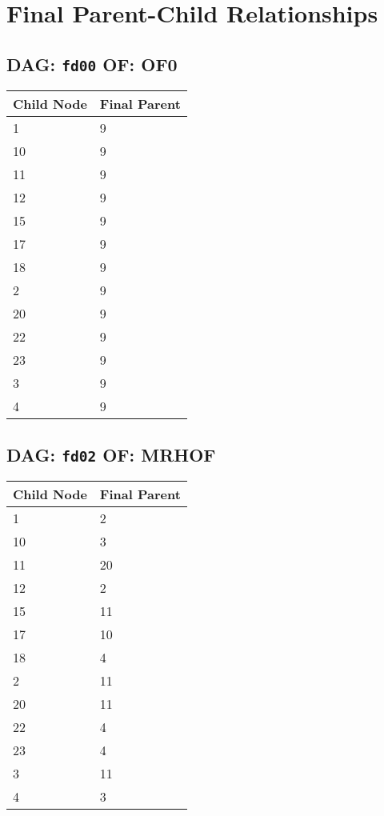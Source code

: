\documentclass{article}
\begin{document}
\pagestyle{fancy}
\fancyhf{}
\section*{Final Parent-Child Relationships}
\subsection*{DAG: \texttt{fd00} OF: OF0}
\begin{tabular}{ll}
\toprule
\textbf{Child Node} & \textbf{Final Parent} \\
\midrule
1 & 9 \\
10 & 9 \\
11 & 9 \\
12 & 9 \\
15 & 9 \\
17 & 9 \\
18 & 9 \\
2 & 9 \\
20 & 9 \\
22 & 9 \\
23 & 9 \\
3 & 9 \\
4 & 9 \\
\bottomrule
\end{tabular}

\subsection*{DAG: \texttt{fd02} OF: MRHOF}
\begin{tabular}{ll}
\toprule
\textbf{Child Node} & \textbf{Final Parent} \\
\midrule
1 & 2 \\
10 & 3 \\
11 & 20 \\
12 & 2 \\
15 & 11 \\
17 & 10 \\
18 & 4 \\
2 & 11 \\
20 & 11 \\
22 & 4 \\
23 & 4 \\
3 & 11 \\
4 & 3 \\
\bottomrule
\end{tabular}
\end{document}
